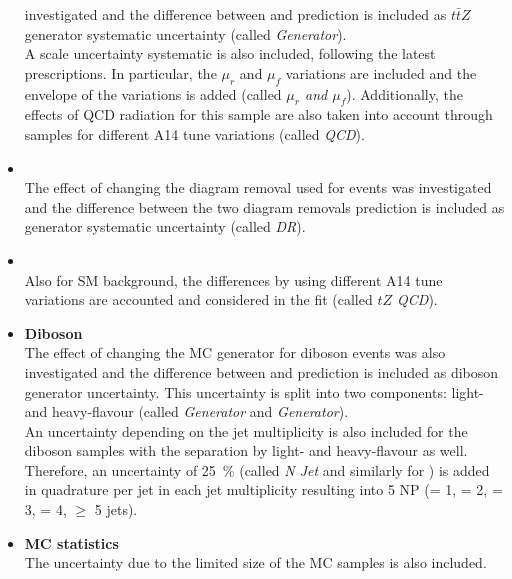 \begin{itemize}
	investigated and the difference between \aMCatNLO and \Sherpa
	prediction is included as $t\bar{t}Z$ generator systematic
	uncertainty (called \textit{\ttZ Generator}). \\
	A scale uncertainty systematic is also included, following the
	latest prescriptions. In particular, the $\mu_r$ and $\mu_f$
	variations are included and the envelope of the variations is added 
	(called \textit{\ttZ $\mu_r$ and $\mu_f$}).
	Additionally, the effects of QCD radiation for this
	sample are also taken into account through samples for different A14
	tune variations (called \textit{\ttZ QCD}).\\
	\item \textbf{\tWZ} \\
	The effect of changing the diagram removal used for \tWZ events was
	investigated and the difference between the two diagram removals
	prediction is included as \tWZ generator systematic uncertainty
	(called \textit{\tWZ DR}).\\
	\item \textbf{\tZq} \\
	Also for SM \tZq background, the differences by using different A14
	tune variations are accounted and considered in the fit (called
	\textit{$tZ$ QCD}).\\
	\item \textbf{Diboson} \\
	The effect of changing the MC generator for diboson events was also
	investigated and the difference between \Sherpa and \PowhegBox
	prediction is included as diboson generator uncertainty. This
	uncertainty is split into two components: light- and heavy-flavour
	(called \textit{\VVLF Generator} and \textit{\VVHF Generator}). \\
	An uncertainty depending on the jet multiplicity is also included for
	the diboson samples with the separation by light- and heavy-flavour as
	well. Therefore, an uncertainty of \SI{25}{\%} 
	(called \textit{\VVLF N Jet} and similarly for \VVHF) is added in quadrature
	per jet in each jet multiplicity resulting into 
	5 NP (= 1, = 2, = 3, = 4, $\geq$ 5 jets). \\ 
	\item \textbf{MC statistics} \\ 
	The uncertainty due to the limited size of the MC samples is also included.
\end{itemize}

